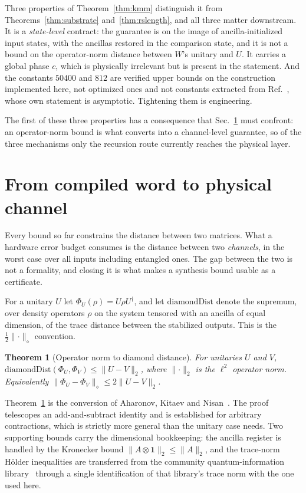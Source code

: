 \documentclass[aps,pra,reprint,nofootinbib,superscriptaddress]{revtex4-2}
\newcommand{\opn}[1]{\lVert #1 \rVert}
\theoremstyle{plain}
\newtheorem{theorem}{Theorem}
\theoremstyle{definition}
\begin{document}
Three properties of Theorem~\ref{thm:kmm} distinguish it from
Theorems~\ref{thm:substrate} and~\ref{thm:rslength}, and all three matter
downstream. It is a \emph{state-level} contract: the guarantee is on the image
of ancilla-initialized input states, with the ancillas restored in the
comparison state, and it is not a bound on the operator-norm distance between
$W$'s unitary and $U$. It carries a global phase $c$, which is physically
irrelevant but is present in the statement. And the constants $50400$ and $812$
are verified upper bounds on the construction implemented here, not optimized
ones and not constants extracted from Ref.~\cite{KMM2013ancilla}, whose own
statement is asymptotic. Tightening them is engineering.

The first of these three properties has a consequence that
Sec.~\ref{sec:diamond} must confront: an operator-norm bound is what converts
into a channel-level guarantee, so of the three mechanisms only the recursion
route currently reaches the physical layer.

\section{From compiled word to physical channel}
\label{sec:diamond}

Every bound so far constrains the distance between two matrices. What a
hardware error budget consumes is the distance between two \emph{channels}, in
the worst case over all inputs including entangled ones. The gap between the
two is not a formality, and closing it is what makes a synthesis bound usable
as a certificate.

For a unitary $U$ let $\Phi_U(\rho) = U\rho U^{\dagger}$, and let
$\mathrm{diamondDist}$ denote the supremum, over density operators $\rho$ on
the system tensored with an ancilla of equal dimension, of the trace distance
between the stabilized outputs. This is the $\tfrac12\lVert\cdot\rVert_\diamond$
convention.

\begin{theorem}[Operator norm to diamond distance]
\label{thm:akn}
For unitaries $U$ and $V$,
$\mathrm{diamondDist}(\Phi_U, \Phi_V) \le \opn{U - V}_{2}$,
where $\opn{\cdot}_2$ is the $\ell^2$ operator norm. Equivalently
$\lVert \Phi_U - \Phi_V\rVert_\diamond \le 2\opn{U-V}_2$.
\end{theorem}

Theorem~\ref{thm:akn} is the conversion of Aharonov, Kitaev and
Nisan~\cite{AKN1998}. The proof telescopes an add-and-subtract identity and is
established for arbitrary contractions, which is strictly more general than the
unitary case needs. Two supporting bounds carry the dimensional bookkeeping: the
ancilla register is handled by the Kronecker bound
$\opn{A \otimes \mathbf 1}_2 \le \opn{A}_2$, and the trace-norm H\"older
inequalities are transferred from the community quantum-information
library~\cite{Meiburg2025PhysLib} through a single identification of that
library's trace norm with the one used here.
\end{document}
